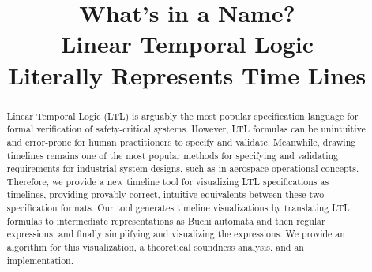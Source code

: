 \documentclass[conference]{IEEEtran}
\theoremstyle{definition}
\theoremstyle{remark}
\begin{document}
\title{What's in a Name? \\ Linear Temporal Logic \\ Literally Represents Time Lines}

\author{
\and
{}
\and
{}
\and
{}
}

\maketitle
\begingroup\renewcommand\thefootnote{\textsection}
\endgroup

\thispagestyle{plain}
\pagestyle{plain}


\begin{abstract}
  Linear Temporal Logic (LTL) is arguably the most popular specification language for formal verification of safety-critical systems.
  However, LTL formulas can be unintuitive and error-prone for human practitioners to specify and validate. Meanwhile, drawing timelines remains one of the most popular methods for specifying and validating requirements for industrial system designs, such as in aerospace operational concepts.
  Therefore, we provide a new timeline tool for visualizing LTL specifications as timelines, providing provably-correct, intuitive equivalents between these two specification formats.
  Our tool generates timeline visualizations by translating LTL formulas to intermediate representations as B\"{u}chi automata and then regular expressions, and finally simplifying and visualizing the expressions.
  We provide an algorithm for this visualization, a theoretical soundness analysis, and an implementation.
\end{abstract}
\end{document}

